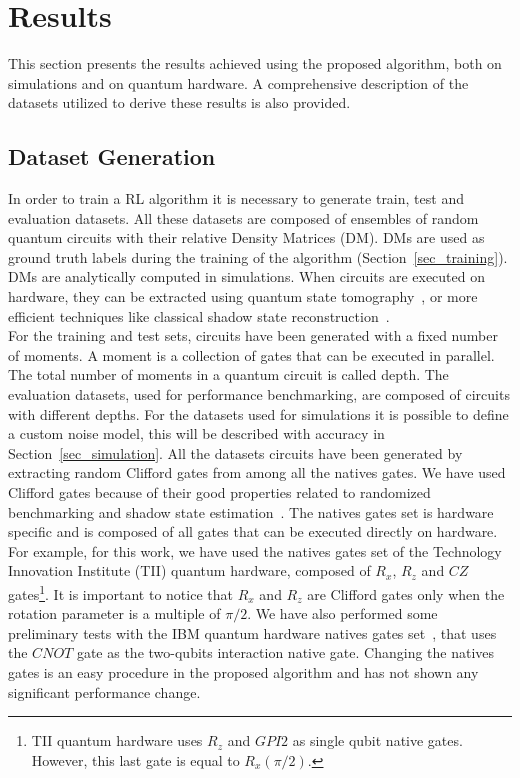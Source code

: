 \documentclass[sn-basic]{sn-jnl} %
\begin{document}
\section{Results} \label{sec_results}
This section presents the results achieved using the proposed algorithm, both on simulations and on quantum hardware. 
A comprehensive description of the datasets utilized to derive these results is also provided.

\subsection{Dataset Generation}\label{sec_dataset}
In order to train a RL algorithm it is necessary to generate train, test and evaluation datasets.
All these datasets are composed of ensembles of random quantum circuits with their relative Density Matrices (DM). 
DMs are used as ground truth labels during the training of the algorithm (Section~\ref{sec_training}). 
DMs are analytically computed in simulations.  When circuits are executed on hardware, they can be extracted using quantum state 
tomography~\cite{PhysRevLett.109.120403}, or more efficient techniques like classical shadow state 
reconstruction~\cite{PRXQuantum.2.010307, Eisert_2020, PRXQuantum.2.030348}.\\ 
For the training and test sets, circuits have been generated with a fixed number of moments. 
A moment is a collection of gates that can be executed in parallel. The total number of moments in a quantum circuit is called depth.  
The evaluation datasets, used for performance benchmarking, are composed of circuits with different depths. 
For the datasets used for simulations it is possible to define a custom noise model, this will be described with accuracy in Section~\ref{sec_simulation}. 
All the datasets circuits have been generated by extracting random Clifford gates from among all the natives gates. 
We have used Clifford gates because of their good properties related to randomized benchmarking and shadow state estimation~\cite{2019npj, PhysRevA.77.012307, Eisert_2020, PRXQuantum.2.030348}.
The natives gates set is hardware specific and is composed of all gates that can be executed directly on hardware. 
For example, for this work, we have used the natives gates set of the Technology Innovation Institute (TII) quantum hardware, 
composed of $R_x$, $R_z$ and $CZ$ gates\footnote{TII quantum hardware uses $R_z$ and $GPI2$ as single qubit native gates. 
However, this last gate is equal to $R_x(\pi/2)$.}. It is important to notice that $R_x$ and $R_z$ are Clifford gates only when the rotation parameter 
is a multiple of $\pi/2$. We have also performed some preliminary tests with the IBM quantum hardware natives gates set~\cite{Santos_2016}, 
that uses the $CNOT$ gate as the two-qubits interaction native gate. Changing the natives gates is an easy procedure in the proposed algorithm 
and has not shown any significant performance change.
\end{document}
